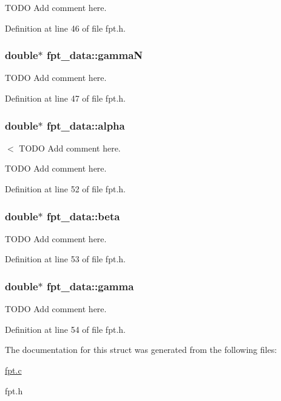 TODO Add comment here. 



Definition at line 46 of file fpt.h.\hypertarget{structfpt__data_a6986fbcdce61cdbaf09c92632880feb}{
\subsubsection{\setlength{\rightskip}{0pt plus 5cm}double$\ast$ {\bf fpt\_\-data::gammaN}}}
\label{structfpt__data_a6986fbcdce61cdbaf09c92632880feb}


TODO Add comment here. 



Definition at line 47 of file fpt.h.\hypertarget{structfpt__data_e132db4edcdbf60c1f61760e3f595259}{
\subsubsection{\setlength{\rightskip}{0pt plus 5cm}double$\ast$ {\bf fpt\_\-data::alpha}}}
\label{structfpt__data_e132db4edcdbf60c1f61760e3f595259}


$<$ TODO Add comment here. 

TODO Add comment here. 

Definition at line 52 of file fpt.h.\hypertarget{structfpt__data_ba9cfecd384591c476464842ed5ddb2d}{
\subsubsection{\setlength{\rightskip}{0pt plus 5cm}double$\ast$ {\bf fpt\_\-data::beta}}}
\label{structfpt__data_ba9cfecd384591c476464842ed5ddb2d}


TODO Add comment here. 



Definition at line 53 of file fpt.h.\hypertarget{structfpt__data_44795aeed3218709fa139025fcd22451}{
\subsubsection{\setlength{\rightskip}{0pt plus 5cm}double$\ast$ {\bf fpt\_\-data::gamma}}}
\label{structfpt__data_44795aeed3218709fa139025fcd22451}


TODO Add comment here. 



Definition at line 54 of file fpt.h.

The documentation for this struct was generated from the following files:\begin{CompactItemize}
\item 
\hyperlink{fpt_8c}{fpt.c}\item 
fpt.h\end{CompactItemize}
